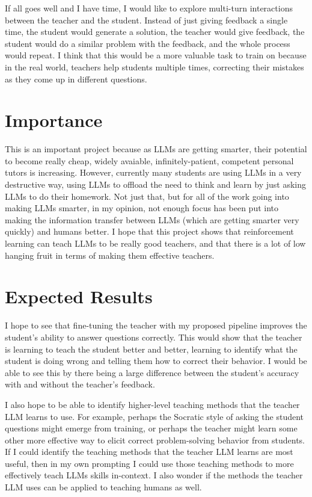 \documentclass{article}
\begin{document}
If all goes well and I have time, I would like to explore multi-turn interactions between
the teacher and the student. Instead of just giving feedback a single time, the student would generate
a solution, the teacher would give feedback, the student would do a similar problem with the feedback,
and the whole process would repeat. I think that this would be a more valuable task to train on because
in the real world, teachers help students multiple times, correcting their mistakes as they come up in
different questions.

\section{Importance}
This is an important project because as LLMs are getting smarter, their potential to become
really cheap, widely avaiable, infinitely-patient, competent personal tutors is increasing.
However, currently many students are using LLMs in a very destructive way, using LLMs to offload
the need to think and learn by just asking LLMs to do their homework. Not just that, but for all of the
work going into making LLMs smarter, in my opinion, not enough focus has been put into making the information
transfer between LLMs (which are getting smarter very quickly) and humans better. I hope that this project
shows that reinforcement learning can teach LLMs to be really good teachers, and that there is a lot of
low hanging fruit in terms of making them effective teachers.

\section{Expected Results}
I hope to see that fine-tuning the teacher with my proposed pipeline improves the student's ability
to answer questions correctly. This would show that the teacher is learning to teach the student better
and better, learning to identify what the student is doing wrong and telling them how to correct their behavior.
I would be able to see this by there being a large difference between the student's accuracy with and without
the teacher's feedback.

I also hope to be able to identify higher-level teaching methods that the teacher LLM learns to use.
For example, perhaps the Socratic style of asking the student questions might emerge from training,
or perhaps the teacher might learn some other more effective way to elicit correct problem-solving behavior
from students. If I could identify the teaching methods that the teacher LLM learns are most useful,
then in my own prompting I could use those teaching methods to more effectively teach LLMs skills in-context.
I also wonder if the methods the teacher LLM uses can be applied to teaching humans as well.
\end{document}
